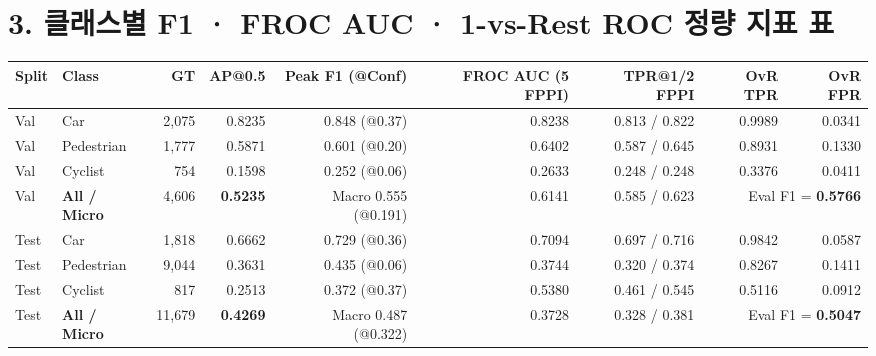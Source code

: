 \documentclass[10pt,a4paper]{article}
\begin{document}
\section*{3. 클래스별 F1 · FROC AUC · 1-vs-Rest ROC 정량 지표 표}
\begin{center}
\small
\begin{tabular}{llrrrrrrr}
\toprule
\textbf{Split} & \textbf{Class} & \textbf{GT} & \textbf{AP@0.5} & \textbf{Peak F1 (@Conf)} & \textbf{FROC AUC (5 FPPI)} & \textbf{TPR@1/2 FPPI} & \textbf{OvR TPR} & \textbf{OvR FPR} \\
\midrule
Val  & Car        & 2,075 & 0.8235 & 0.848 (@0.37) & 0.8238 & 0.813 / 0.822 & 0.9989 & 0.0341 \\
Val  & Pedestrian & 1,777 & 0.5871 & 0.601 (@0.20) & 0.6402 & 0.587 / 0.645 & 0.8931 & 0.1330 \\
Val  & Cyclist    & 754   & 0.1598 & 0.252 (@0.06) & 0.2633 & 0.248 / 0.248 & 0.3376 & 0.0411 \\
Val  & \textbf{All / Micro} & 4,606 & \textbf{0.5235} & Macro 0.555 (@0.191) & 0.6141 & 0.585 / 0.623 & \multicolumn{2}{r}{Eval F1 = \textbf{0.5766}} \\
\midrule
Test & Car        & 1,818 & 0.6662 & 0.729 (@0.36) & 0.7094 & 0.697 / 0.716 & 0.9842 & 0.0587 \\
Test & Pedestrian & 9,044 & 0.3631 & 0.435 (@0.06) & 0.3744 & 0.320 / 0.374 & 0.8267 & 0.1411 \\
Test & Cyclist    & 817   & 0.2513 & 0.372 (@0.37) & 0.5380 & 0.461 / 0.545 & 0.5116 & 0.0912 \\
Test & \textbf{All / Micro} & 11,679 & \textbf{0.4269} & Macro 0.487 (@0.322) & 0.3728 & 0.328 / 0.381 & \multicolumn{2}{r}{Eval F1 = \textbf{0.5047}} \\
\bottomrule
\end{tabular}
\end{center}
\end{document}
